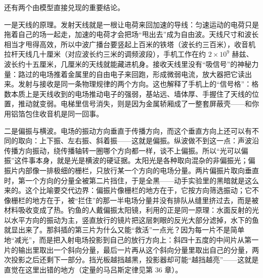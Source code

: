 \begin{mainline}
还有两个由模型直接兑现的重要结论。

一是天线的原理。发射天线就是一根让电荷来回加速的导线：匀速运动的电荷只是拖着自己的场一起走，加速的电荷才会把场“甩出去”成为自由波。天线尺寸和波长相当才甩得高效，所以中波广播台要竖起上百米的铁塔（波长约三百米），收音机拉杆天线几十厘米（对应波长约三米的调频波段），手机工作在约 $2\times10^{9}$ 赫兹、波长约十五厘米，几厘米的天线就能藏进机身。接收天线里没有“吸信号”的神秘力量：路过的电场推着金属里的自由电子来回跑，形成微弱电流，放大器把它读出来。发射与接收是同一条物理规律的两个方向。这也解释了手机上的“信号格”：格数本质上是天线收到的电场推动电子的强弱，基站远、墙体厚、手握住了天线的位置，推动就变弱。电梯里信号消失，则是因为金属轿厢成了一整套屏蔽壳——和你用铝箔包住收音机是同一回事。

\begin{center}
\end{center}

二是偏振与横波。电场的振动方向垂直于传播方向，而这个垂直方向上还可以有不同的取向：上下振、左右振、斜着振——这就是偏振。纵波做不到这一点：声波沿传播方向振动，绕传播轴转一圈哪个方向都一样，谈不上偏振。所以“光可以偏振”这件事本身，就是光是横波的硬证据。太阳光是各种取向混杂的非偏振光；偏振片内部像一排极细的栅栏，只放行某一个方向的电场分量。两片偏振片取向垂直时，第一个方向的分量全被第二片挡住，于是全黑——动手实验里的黑暗就是这么来的。这个比喻要交代边界：偏振片像栅栏的地方在于，它按方向筛选振动；它不像栅栏的地方在于，被“拦住”的那一半电场分量并没有排队从缝里挤过去，而是被材料吸收变成了热。钓鱼的人戴偏振太阳镜，利用的正是同一原理：水面反射的光以水平方向的振动为主，竖直放行的镜片把这层刺眼的反光大部分滤掉，水下的鱼就显出来了。那斜插的第三片为什么又能“救活”一点光？因为每一片不是简单地“减光”，而是把入射电场投影到自己的放行方向上：斜四十五度的中间片从第一片的输出里取出一个斜向分量，最后一片再从这个斜向分量里取出自己的分量，两次投影之后还剩下一部分。挡光板越挡越黑，投影器却可能“越挡越亮”——这就是直觉在这里出错的地方（定量的马吕斯定律见第 36 章）。
\end{mainline}


